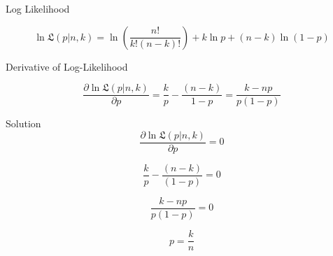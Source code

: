 \documentclass[12pt]{report}
\begin{document}
Log Likelihood

\begin{equation}
\ln \mathfrak{L}(p | n, k) = \ln \left( \frac{n!}{k!(n-k)!}\right) + k \ln p  + (n-k) \ln (1-p)
\end{equation}

Derivative of Log-Likelihood

\begin{equation}
\frac{\partial \ln \mathfrak{L}(p | n, k)}{\partial p} = \frac{k}{p} - \frac{(n-k)}{1 - p} = \frac{k - np}{p (1-p)}
\end{equation}


Solution 
\begin{equation}
\frac{\partial \ln \mathfrak{L}(p | n, k)}{\partial p} = 0
\end{equation}

\begin{equation}
\frac{k}{p} - \frac{(n-k)}{(1-p)} = 0
\end{equation}

\begin{equation}
\frac{k - np}{p (1-p)} = 0
\end{equation}

\begin{equation}
p = \frac{k}{n}
\end{equation}
\end{document}
